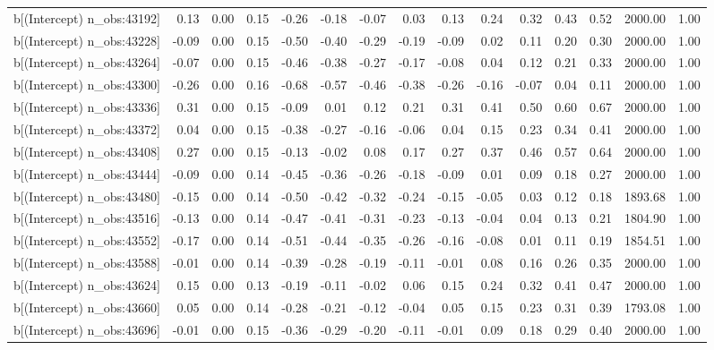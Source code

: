 \begin{table}[ht]
\begin{tabular}{rrrrrrrrrrrrrrr}
  b[(Intercept) n\_obs:43192] & 0.13 & 0.00 & 0.15 & -0.26 & -0.18 & -0.07 & 0.03 & 0.13 & 0.24 & 0.32 & 0.43 & 0.52 & 2000.00 & 1.00 \\ 
  b[(Intercept) n\_obs:43228] & -0.09 & 0.00 & 0.15 & -0.50 & -0.40 & -0.29 & -0.19 & -0.09 & 0.02 & 0.11 & 0.20 & 0.30 & 2000.00 & 1.00 \\ 
  b[(Intercept) n\_obs:43264] & -0.07 & 0.00 & 0.15 & -0.46 & -0.38 & -0.27 & -0.17 & -0.08 & 0.04 & 0.12 & 0.21 & 0.33 & 2000.00 & 1.00 \\ 
  b[(Intercept) n\_obs:43300] & -0.26 & 0.00 & 0.16 & -0.68 & -0.57 & -0.46 & -0.38 & -0.26 & -0.16 & -0.07 & 0.04 & 0.11 & 2000.00 & 1.00 \\ 
  b[(Intercept) n\_obs:43336] & 0.31 & 0.00 & 0.15 & -0.09 & 0.01 & 0.12 & 0.21 & 0.31 & 0.41 & 0.50 & 0.60 & 0.67 & 2000.00 & 1.00 \\ 
  b[(Intercept) n\_obs:43372] & 0.04 & 0.00 & 0.15 & -0.38 & -0.27 & -0.16 & -0.06 & 0.04 & 0.15 & 0.23 & 0.34 & 0.41 & 2000.00 & 1.00 \\ 
  b[(Intercept) n\_obs:43408] & 0.27 & 0.00 & 0.15 & -0.13 & -0.02 & 0.08 & 0.17 & 0.27 & 0.37 & 0.46 & 0.57 & 0.64 & 2000.00 & 1.00 \\ 
  b[(Intercept) n\_obs:43444] & -0.09 & 0.00 & 0.14 & -0.45 & -0.36 & -0.26 & -0.18 & -0.09 & 0.01 & 0.09 & 0.18 & 0.27 & 2000.00 & 1.00 \\ 
  b[(Intercept) n\_obs:43480] & -0.15 & 0.00 & 0.14 & -0.50 & -0.42 & -0.32 & -0.24 & -0.15 & -0.05 & 0.03 & 0.12 & 0.18 & 1893.68 & 1.00 \\ 
  b[(Intercept) n\_obs:43516] & -0.13 & 0.00 & 0.14 & -0.47 & -0.41 & -0.31 & -0.23 & -0.13 & -0.04 & 0.04 & 0.13 & 0.21 & 1804.90 & 1.00 \\ 
  b[(Intercept) n\_obs:43552] & -0.17 & 0.00 & 0.14 & -0.51 & -0.44 & -0.35 & -0.26 & -0.16 & -0.08 & 0.01 & 0.11 & 0.19 & 1854.51 & 1.00 \\ 
  b[(Intercept) n\_obs:43588] & -0.01 & 0.00 & 0.14 & -0.39 & -0.28 & -0.19 & -0.11 & -0.01 & 0.08 & 0.16 & 0.26 & 0.35 & 2000.00 & 1.00 \\ 
  b[(Intercept) n\_obs:43624] & 0.15 & 0.00 & 0.13 & -0.19 & -0.11 & -0.02 & 0.06 & 0.15 & 0.24 & 0.32 & 0.41 & 0.47 & 2000.00 & 1.00 \\ 
  b[(Intercept) n\_obs:43660] & 0.05 & 0.00 & 0.14 & -0.28 & -0.21 & -0.12 & -0.04 & 0.05 & 0.15 & 0.23 & 0.31 & 0.39 & 1793.08 & 1.00 \\ 
  b[(Intercept) n\_obs:43696] & -0.01 & 0.00 & 0.15 & -0.36 & -0.29 & -0.20 & -0.11 & -0.01 & 0.09 & 0.18 & 0.29 & 0.40 & 2000.00 & 1.00 \\ 

\end{tabular}
\end{table}
